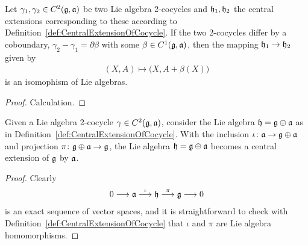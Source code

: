\begin{lemma}
  \label{lem:CentralExtensionOfCocycleModCoboundary}
  \leanok
  Let $\gamma_1, \gamma_2 \in C^2(\mathfrak{g},\mathfrak{a})$ be two Lie algebra
  2-cocycles and $\mathfrak{h}_1, \mathfrak{h}_2$ the central extensions corresponding
  to these according to Definition~\ref{def:CentralExtensionOfCocycle}.
  If the two 2-cocycles differ by a coboundary,
  $\gamma_2 - \gamma_1 = \partial \beta$ with some $\beta \in C^1(\mathfrak{g},\mathfrak{a})$,
  then the mapping $\mathfrak{h}_1 \to \mathfrak{h}_2$ given by
  \begin{align*}
    (X,A) \mapsto \big( X, A + \beta(X) \big)
  \end{align*}
  is an isomophism of Lie algebras.
\end{lemma}
\begin{proof}
  \leanok
  Calculation.
\end{proof}

\begin{lemma}
  \label{lem:OfCocycleIsCentralExtension}
  \leanok
  Given a Lie algebra 2-cocycle $\gamma \in C^2(\mathfrak{g},\mathfrak{a})$,
  consider the Lie algebra $\mathfrak{h} = \mathfrak{g} \oplus \mathfrak{a}$ as
  in Definition~\ref{def:CentralExtensionOfCocycle}.
  With the inclusion $\iota \colon \mathfrak{a} \to \mathfrak{g} \oplus \mathfrak{a}$
  and projection $\pi \colon \mathfrak{g} \oplus \mathfrak{a} \to \mathfrak{g}$,
  the Lie algebra $\mathfrak{h} = \mathfrak{g} \oplus \mathfrak{a}$ becomes a central
  extension of $\mathfrak{g}$ by $\mathfrak{a}$.
\end{lemma}
\begin{proof}
  \leanok
  Clearly
  \begin{align*}
    0 \longrightarrow \mathfrak{a}
      \overset{\iota}{\longrightarrow} \mathfrak{h}
      \overset{\pi}{\longrightarrow} \mathfrak{g}
      \longrightarrow 0
  \end{align*}
  is an exact sequence of vector spaces, and it is straightforward
  to check with Definition~\ref{def:CentralExtensionOfCocycle}
  that $\iota$ and $\pi$ are Lie algebra homomorphisms.
\end{proof}
